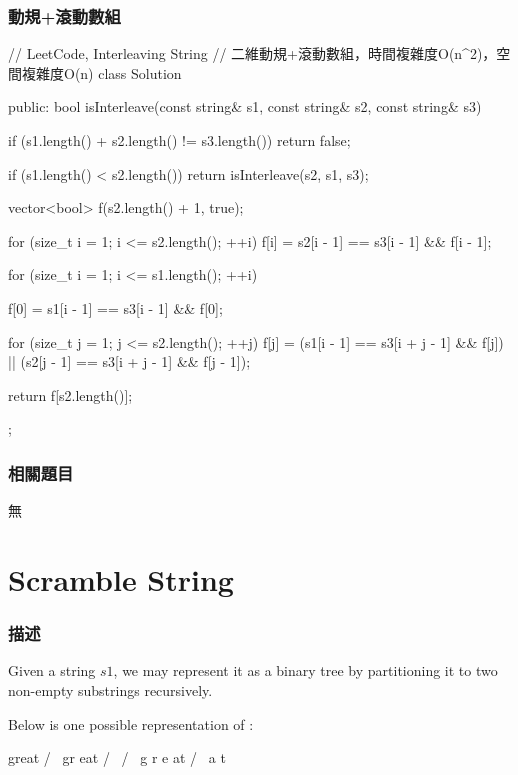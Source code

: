 \subsubsection{動規+滾動數組}
\begin{Code}
// LeetCode, Interleaving String
// 二維動規+滾動數組，時間複雜度O(n^2)，空間複雜度O(n)
class Solution {
public:
    bool isInterleave(const string& s1, const string& s2, const string& s3) {
        if (s1.length() + s2.length() != s3.length())
            return false;

        if (s1.length() < s2.length())
            return isInterleave(s2, s1, s3);

        vector<bool> f(s2.length() + 1, true);

        for (size_t i = 1; i <= s2.length(); ++i)
            f[i] = s2[i - 1] == s3[i - 1] && f[i - 1];

        for (size_t i = 1; i <= s1.length(); ++i) {
            f[0] = s1[i - 1] == s3[i - 1] && f[0];

            for (size_t j = 1; j <= s2.length(); ++j)
                f[j] = (s1[i - 1] == s3[i + j - 1] && f[j])
                        || (s2[j - 1] == s3[i + j - 1] && f[j - 1]);
        }

        return f[s2.length()];
    }
};
\end{Code}


\subsubsection{相關題目}
\begindot
\item 無
\myenddot


\section{Scramble String} %
\label{sec:scramble-string}


\subsubsection{描述}
Given a string $s1$, we may represent it as a binary tree by partitioning it to two non-empty substrings recursively.

Below is one possible representation of :
\begin{Code}
    great
   /    \
  gr    eat
 / \    /  \
g   r  e   at
           / \
          a   t
\end{Code}

